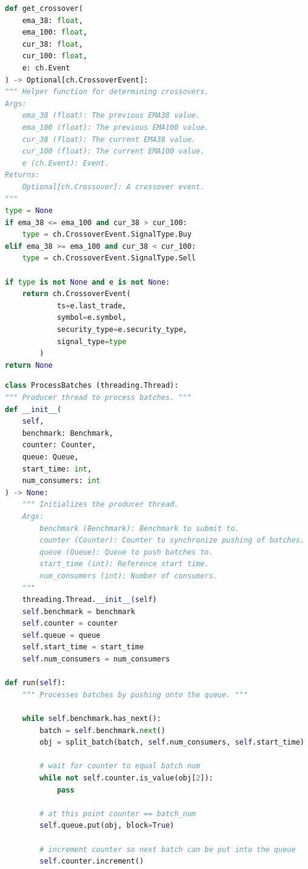 \begin{minipage}{0.9\linewidth}
\begin{lstlisting}[caption={Query 2}, label={lst:createDataFrame4},language=Python]
def get_crossover(
    ema_38: float,
    ema_100: float,
    cur_38: float,
    cur_100: float,
    e: ch.Event
) -> Optional[ch.CrossoverEvent]:
""" Helper function for determining crossovers.
Args:
    ema_38 (float): The previous EMA38 value.
    ema_100 (float): The previous EMA100 value.
    cur_38 (float): The current EMA38 value.
    cur_100 (float): The current EMA100 value.
    e (ch.Event): Event.
Returns:
    Optional[ch.Crossover]: A crossover event.
"""
type = None
if ema_38 <= ema_100 and cur_38 > cur_100:
    type = ch.CrossoverEvent.SignalType.Buy
elif ema_38 >= ema_100 and cur_38 < cur_100:
    type = ch.CrossoverEvent.SignalType.Sell

if type is not None and e is not None:
    return ch.CrossoverEvent(
            ts=e.last_trade,
            symbol=e.symbol,
            security_type=e.security_type,
            signal_type=type
        )    
return None
\end{lstlisting}
\end{minipage}





\begin{minipage}{0.9\linewidth}
\begin{lstlisting}[caption={Stream Processing Batch}, label={lst:createDataFrame4},language=Python]
class ProcessBatches (threading.Thread):
""" Producer thread to process batches. """
def __init__(
    self,
    benchmark: Benchmark,
    counter: Counter,
    queue: Queue,
    start_time: int,
    num_consumers: int
) -> None:
    """ Initializes the producer thread.
    Args:
        benchmark (Benchmark): Benchmark to submit to.
        counter (Counter): Counter to synchronize pushing of batches.
        queue (Queue): Queue to push batches to.
        start_time (int): Reference start time.
        num_consumers (int): Number of consumers.
    """
    threading.Thread.__init__(self)
    self.benchmark = benchmark
    self.counter = counter
    self.queue = queue
    self.start_time = start_time
    self.num_consumers = num_consumers        

def run(self):
    """ Processes batches by pushing onto the queue. """

    while self.benchmark.has_next():
        batch = self.benchmark.next()
        obj = split_batch(batch, self.num_consumers, self.start_time)
        
        # wait for counter to equal batch num 
        while not self.counter.is_value(obj[2]):
            pass

        # at this point counter == batch_num
        self.queue.put(obj, block=True)

        # increment counter so next batch can be put into the queue
        self.counter.increment()
\end{lstlisting}
\end{minipage}
    
    


